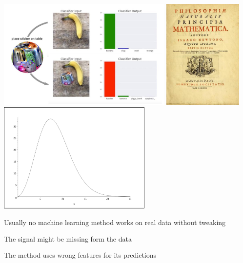 \documentclass[landscape,footrule]{foils}
\begin{document}
\begin{tabbing}
   \> \includegraphics[height = 5.5cm]{adversarial-learning}
   \>  \includegraphics[height = 5.5cm, trim=-0.0cm 0cm 0.0cm 0cm, clip]{principia-mathematica}
       \includegraphics[height = 5.5cm, trim=2.5cm 0.4cm 10.5cm 0.4cm, clip]{curse-of-dimensions}

\end{tabbing}





Usually no machine learning method works on real data without tweaking 
\begin{triangles}
 \item The signal might be missing form the data 
 \item The method uses wrong features for its predictions 
\end{triangles}
\end{document}
